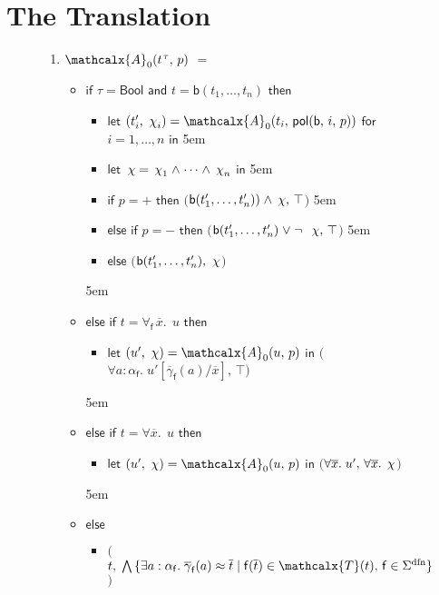 \documentclass[runningheads,a4paper]{llncs}
\newcommand\return{}
\newcommand\bigtuple[1]{$\bigl(${#1}$\bigr)$}
\newcommand{\con}[1]{\mathsf{#1}}
\renewcommand\vec[1]{\overline{#1}}
\let\oldchi=\chi
\def\chi{{\vthinspace\oldchi}}
\let\oldSigma=\Sigma
\def\Sigma{\mathrm{\oldSigma}}
\let\oldneg=\neg
\def\neg{\oldneg\;}
\let\oldvee=\vee
\def\vee{\mathrel{\oldvee}}
\let\oldwedge=\wedge
\def\wedge{\mathrel{\oldwedge}}
\newcommand{\teq}{\approx}
\newcommand{\terms}{\mathcalx{T}}
\newcommand{\conv}{\mathcalx{A}}
\newcommand{\sfundefs}[1]{#1^\mathrm{dfn}}
\newcommand{\ppos}{{+}}
\newcommand{\pneg}{{-}}
\newcommand{\pol}{\con{pol}}
\newcommand\ty[1]{\con{#1}}
\newcommand{\Bool}{\ty{Bool}}
\newcommand{\ltrue}{\top}
\newcommand\concret{\gamma} %
\newcommand{\boolop}{\con{b}}
\newcommand{\forallf}[1]{\forall_{\!#1\:}}
\newcommand{\vecfarg}[1]{\vec{\concret}_{#1}}
\newcommand{\fargtype}[1]{\alpha_{#1}}
\newcommand{\vthinspace}{\kern+0.083333em}
\newcommand{\typ}[1]{^{\vthinspace #1}}
\begin{document}
\section{The Translation}
\label{sec:encoding}

\newcommand{\itemx}{\itemindent5em\item}

\begin{figure}[t]
\normalsize
\begin{enumerate}
\itemx[\ ]
$\conv_0( t\typ{\tau},\, p )$ $=$
\\[-.8\baselineskip]
 \begin{itemize}
   \itemx[] $\mathsf{if}$ $\tau = \Bool$ $\mathsf{and}$ $t = \boolop(t_1,\ldots,t_n)$ $\mathsf{then}$
    \begin{itemize}
      \itemx[] $\mathsf{let}$ $( t'_i,\, \chi_i ) = \conv_0( t_i,\, \pol( \boolop,\, i,\, p ) )$ $\mathsf{for}$ $i = 1, \ldots, n$ $\mathsf{in}$%
      \itemx[] $\mathsf{let}$ $\chi = \chi_1 \wedge \cdots \wedge \chi_n$ $\mathsf{in}$
      \itemx[] $\mathsf{if}$ $p = \ppos$ $\mathsf{then}$ \bigtuple{$\boolop(t'_1, \ldots, t'_n) ) \wedge \chi,\, \ltrue$}
      \itemx[] $\mathsf{else}$ $\mathsf{if}$ $p = \pneg$ $\mathsf{then}$ \bigtuple{$\boolop(t'_1, \ldots, t'_n) \vee \neg \chi,\, \ltrue$}
      \itemx[] $\mathsf{else}$ \bigtuple{$\boolop(t'_1, \ldots, t'_n),\, \chi$}
\\[-.8\baselineskip]
    \end{itemize}
  \itemx[] $\mathsf{else}$ $\mathsf{if}$ $t = \forallf{\con{f}} \vec x.\;\, u$ $\mathsf{then}$
    \begin{itemize}
      \itemx[] $\mathsf{let}$ $( u',\, \chi ) = \conv_0( u,\, p )$ $\mathsf{in}$ \bigtuple{$\forall a : \fargtype{\con{f}}.\; u' [ \vecfarg{\con{f}}( a ) / \vec x ],\, \ltrue$}
\\[-.8\baselineskip]
    \end{itemize}
  \itemx[] $\mathsf{else}$ $\mathsf{if}$ $t = \forall \vec x.\;\, u$ $\mathsf{then}$
    \begin{itemize}
      \itemx[] $\mathsf{let}$ $( u',\, \chi ) = \conv_0( u,\, p )$ $\mathsf{in}$ \bigtuple{$\forall \vec x.\; u',\, \forall \vec x.\; \chi$}
\\[-.8\baselineskip]
    \end{itemize}
   \itemx[] $\mathsf{else}$
   \begin{itemize}
     \itemx[] \return \bigtuple{$t,\; \bigwedge\, \{ \exists a : \fargtype{\con{f}}.\; \vecfarg{\con{f}}( a ) \teq \vec t \mid \con{f}( \vec t ) \in \terms( t ),\, \con{f} \in \sfundefs{\Sigma} \}$}

\end{itemize}
\end{itemize}
\end{enumerate}
\end{figure}
\end{document}

